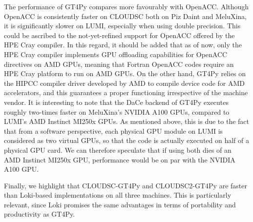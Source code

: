 \documentclass[main.tex]{subfiles}
\begin{document}
    The performance of GT4Py compares more favourably with OpenACC. Although OpenACC is consistently faster on CLOUDSC both on Piz Daint and MeluXina, it is significantly slower on LUMI, especially when using double precision. This could be ascribed to the not-yet-refined support for OpenACC offered by the HPE Cray compiler. In this regard, it should be added that as of now, only the HPE Cray compiler implements GPU offloading capabilities for OpenACC directives on AMD GPUs, meaning that Fortran OpenACC codes require an HPE Cray platform to run on AMD GPUs. On the other hand, GT4Py relies on the HIPCC compiler driver developed by AMD to compile device code for AMD accelerators, and this guarantees a proper functioning irrespective of the machine vendor. It is interesting to note that the DaCe backend of GT4Py executes roughly two-times faster on MeluXina's NVIDIA A100 GPUs, compared to LUMI's AMD Instinct MI250x GPUs. As mentioned above, this is due to the fact that from a software perspective, each physical GPU module on LUMI is considered as two virtual GPUs, so that the code is actually executed on half of a physical GPU card. We can therefore speculate that if using both dies of an AMD Instinct MI250x GPU, performance would be on par with the NVIDIA A100 GPU.

    Finally, we highlight that CLOUDSC-GT4Py and CLOUDSC2-GT4Py are faster than Loki-based implementations on all three machines. This is particularly relevant, since Loki promises the same advantages in terms of portability and productivity as GT4Py.

    \biblio
\end{document}

